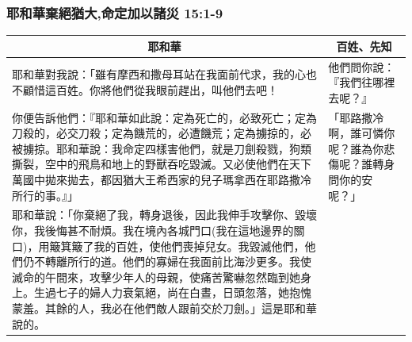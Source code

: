 \subsubsection{耶和華棄絕猶大,命定加以諸災 15:1-9}
\begin{table}[H]
\centering
\begin{tabular}{p{14.5cm}|p{2.750cm}}\hline\hline
\multicolumn{1}{c|}{耶和華}&\multicolumn{1}{c}{百姓、先知}\\\hline
耶和華對我說：「雖有摩西和撒母耳站在我面前代求，我的心也不顧惜這百姓。你將他們從我眼前趕出，叫他們去吧！ 
&他們問你說：『我們往哪裡去呢？』\\\hline
你便告訴他們：『耶和華如此說：定為死亡的，必致死亡；定為刀殺的，必交刀殺；定為饑荒的，必遭饑荒；定為擄掠的，必被擄掠。耶和華說：我命定四樣害他們，就是刀劍殺戮，狗類撕裂，空中的飛鳥和地上的野獸吞吃毀滅。又必使他們在天下萬國中拋來拋去，都因猶大王希西家的兒子瑪拿西在耶路撒冷所行的事。』」
&「耶路撒冷啊，誰可憐你呢？誰為你悲傷呢？誰轉身問你的安呢？」\\\hline
耶和華說：「你棄絕了我，轉身退後，因此我伸手攻擊你、毀壞你，我後悔甚不耐煩。我在境內各城門口(我在這地邊界的關口)，用簸箕簸了我的百姓，使他們喪掉兒女。我毀滅他們，他們仍不轉離所行的道。他們的寡婦在我面前比海沙更多。我使滅命的午間來，攻擊少年人的母親，使痛苦驚嚇忽然臨到她身上。生過七子的婦人力衰氣絕，尚在白晝，日頭忽落，她抱愧蒙羞。其餘的人，我必在他們敵人跟前交於刀劍。」這是耶和華說的。&\\\hline
\end{tabular}
\end{table}



